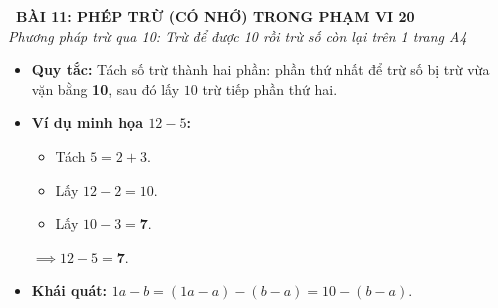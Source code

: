 \documentclass[11pt,a4paper]{article}
\begin{document}
\begin{tcolorbox}[
  enhanced,
  colback=violet!8!white,
  colframe=violet!70!black,
  arc=3mm, boxrule=1.2pt,
  left=3mm, right=3mm, top=2mm, bottom=2mm,
  halign=center
]
  {\LARGE\bfseries\color{violet!90!black}\faBookmark\ BÀI 11: PHÉP TRỪ (CÓ NHỚ) TRONG PHẠM VI 20}\\[1mm]
  {\itshape\footnotesize\color{black!75} Phương pháp trừ qua 10: Trừ để được 10 rồi trừ số còn lại trên 1 trang A4}
\end{tcolorbox}

\vspace{-2mm}

\noindent
\begin{minipage}[t]{0.49\textwidth}\vspace{0pt}
\begin{tcolorbox}[
  enhanced,
  colback=violet!4!white,
  colframe=violet!75!black,
  arc=2mm, boxrule=0.8pt,
  left=2mm, right=2mm, top=1.8mm, bottom=1.8mm,
  title={\footnotesize\bfseries\color{white}\faKey\ 1. Cách 1: Trừ để được 10 rồi trừ tiếp}
]
{\footnotesize
\begin{itemize}\setlength{\itemsep}{1pt}\setlength{\leftskip}{-2.5mm}
  \item \textbf{Quy tắc:} Tách số trừ thành hai phần: phần thứ nhất để trừ số bị trừ vừa vặn bằng \textbf{10}, sau đó lấy $10$ trừ tiếp phần thứ hai.
  \item \textbf{Ví dụ minh họa $12 - 5$:}
  \begin{itemize}\setlength{\itemsep}{0.5pt}\setlength{\leftskip}{-2.5mm}
    \item Tách $5 = 2 + 3$.
    \item Lấy $12 - 2 = 10$.
    \item Lấy $10 - 3 = \mathbf{7}$.
  \end{itemize}
  $\implies 12 - 5 = \mathbf{7}$.
  \item \textbf{Khái quát:} $1a - b = (1a - a) - (b - a) = 10 - (b - a)$.
\end{itemize}
}
\end{tcolorbox}
\end{minipage}
\hfill
\end{document}
